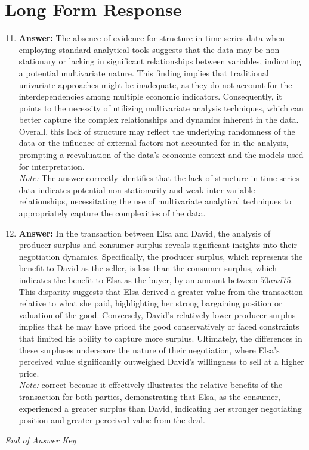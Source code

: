 \documentclass[12pt]{article}
\begin{document}
\section*{Long Form Response}
\begin{enumerate}[label=\arabic*.]
\setcounter{enumi}{10}
\item \textbf{Answer:} The absence of evidence for structure in time-series data when employing standard analytical tools suggests that the data may be non-stationary or lacking in significant relationships between variables, indicating a potential multivariate nature. This finding implies that traditional univariate approaches might be inadequate, as they do not account for the interdependencies among multiple economic indicators. Consequently, it points to the necessity of utilizing multivariate analysis techniques, which can better capture the complex relationships and dynamics inherent in the data. Overall, this lack of structure may reflect the underlying randomness of the data or the influence of external factors not accounted for in the analysis, prompting a reevaluation of the data's economic context and the models used for interpretation.
\\ \textit{Note:} The answer correctly identifies that the lack of structure in time-series data indicates potential non-stationarity and weak inter-variable relationships, necessitating the use of multivariate analytical techniques to appropriately capture the complexities of the data.
\item \textbf{Answer:} In the transaction between Elsa and David, the analysis of producer surplus and consumer surplus reveals significant insights into their negotiation dynamics. Specifically, the producer surplus, which represents the benefit to David as the seller, is less than the consumer surplus, which indicates the benefit to Elsa as the buyer, by an amount between $50 and $75. This disparity suggests that Elsa derived a greater value from the transaction relative to what she paid, highlighting her strong bargaining position or valuation of the good. Conversely, David's relatively lower producer surplus implies that he may have priced the good conservatively or faced constraints that limited his ability to capture more surplus. Ultimately, the differences in these surpluses underscore the nature of their negotiation, where Elsa's perceived value significantly outweighed David's willingness to sell at a higher price.
\\ \textit{Note:} correct because it effectively illustrates the relative benefits of the transaction for both parties, demonstrating that Elsa, as the consumer, experienced a greater surplus than David, indicating her stronger negotiating position and greater perceived value from the deal.
\end{enumerate}

\vfill
\noindent\textit{End of Answer Key}
\end{document}
